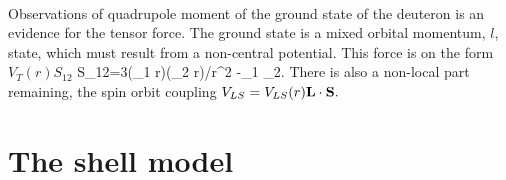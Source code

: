 \\
Observations of quadrupole moment of the ground state of the deuteron is an evidence for the tensor force. The ground state is a mixed orbital momentum, $l$, state, which must 
result from a non-central  potential. This force is on the form $V_T(r)S_{12}$
\be
S_{12}=3(\bold \sigma_1 \cdot \bold r)(\bold \sigma_2 \cdot \bold r)/r^2 -\bold \sigma_1 \cdot \sigma_2.
\ee
There is also a non-local part remaining, the spin orbit coupling $V_{LS}=V_{LS}(r)\bold{L\cdot S}.$ 


\section{The shell model}

